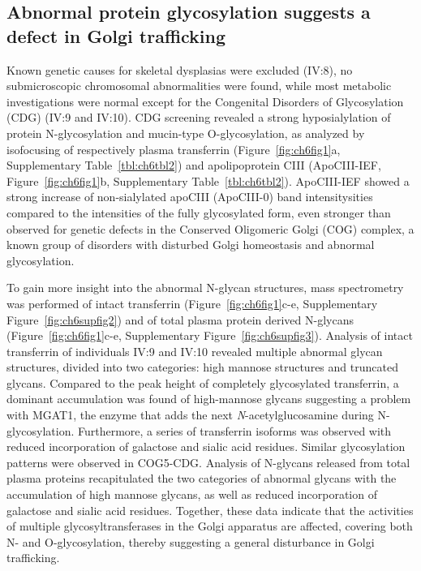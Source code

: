 \subsection{Abnormal protein glycosylation suggests a defect in Golgi trafficking}

Known genetic causes for skeletal dysplasias were excluded (IV:8), no submicroscopic chromosomal abnormalities were found, while most metabolic investigations were normal except for the Congenital Disorders of Glycosylation (CDG) (IV:9 and IV:10). CDG screening revealed a strong hyposialylation of protein N-glycosylation and mucin-type O-glycosylation, as analyzed by isofocusing of respectively plasma transferrin (Figure~\ref{fig:ch6fig1}a, Supplementary Table~\ref{tbl:ch6tbl2}) and apolipoprotein CIII (ApoCIII-IEF, Figure~\ref{fig:ch6fig1}b, Supplementary Table~\ref{tbl:ch6tbl2}). ApoCIII-IEF showed a strong increase of non-sialylated apoCIII (ApoCIII-0) band intensitysities compared to the intensities of the fully glycosylated form, even stronger than observed for genetic defects in the Conserved Oligomeric Golgi (COG) complex, a known group of disorders with disturbed Golgi homeostasis and abnormal glycosylation\cite{linders_sugary_2020}.

To gain more insight into the abnormal N-glycan structures, mass spectrometry was performed of intact transferrin (Figure~\ref{fig:ch6fig1}c-e, Supplementary Figure~\ref{fig:ch6supfig2}) and of total plasma protein derived N-glycans (Figure~\ref{fig:ch6fig1}c-e, Supplementary Figure~\ref{fig:ch6supfig3}). Analysis of intact transferrin of individuals IV:9 and IV:10 revealed multiple abnormal glycan structures, divided into two categories: high mannose structures and truncated glycans. Compared to the peak height of completely glycosylated transferrin, a dominant accumulation was found of high-mannose glycans suggesting a problem with MGAT1, the enzyme that adds the next \emph{N}-acetylglucosamine during N-glycosylation. Furthermore, a series of transferrin isoforms was observed with reduced incorporation of galactose and sialic acid residues. Similar glycosylation patterns were observed in COG5-CDG\cite{fung_cog5-cdg_2012,paesold-burda_deficiency_2009,palmigiano_maldi-ms_2017,rymen_cog5-cdg_2012}. Analysis of N-glycans released from total plasma proteins recapitulated the two categories of abnormal glycans with the accumulation of high mannose glycans, as well as reduced incorporation of galactose and sialic acid residues. Together, these data indicate that the activities of multiple glycosyltransferases in the Golgi apparatus are affected, covering both N- and O-glycosylation, thereby suggesting a general disturbance in Golgi trafficking.   

